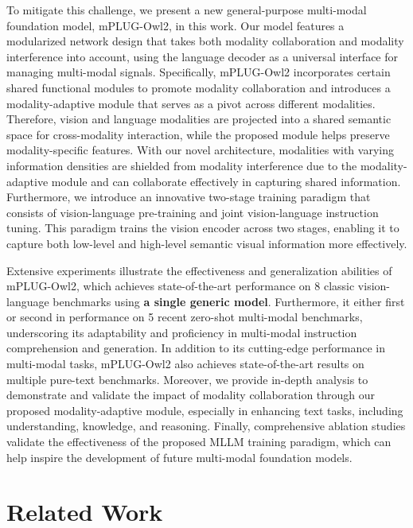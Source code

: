 \documentclass[10pt,twocolumn,letterpaper]{article}
\newcommand{\modelname}{mPLUG-Owl2\xspace}
\begin{document}
To mitigate this challenge, we present a new general-purpose multi-modal foundation model, \modelname, in this work. Our model features a modularized network design that takes both modality collaboration and modality interference into account, using the language decoder as a universal interface for managing multi-modal signals. Specifically, \modelname incorporates certain shared functional modules to promote modality collaboration and introduces a modality-adaptive module that serves as a pivot across different modalities. Therefore, vision and language modalities are projected into a shared semantic space for cross-modality interaction, while the proposed module helps preserve modality-specific features. With our novel architecture, modalities with varying information densities are shielded from modality interference due to the modality-adaptive module and can collaborate effectively in capturing shared information. Furthermore, we introduce an innovative two-stage training paradigm that consists of vision-language pre-training and joint vision-language instruction tuning. This paradigm trains the vision encoder across two stages, enabling it to capture both low-level and high-level semantic visual information more effectively.

Extensive experiments illustrate the effectiveness and generalization abilities of \modelname, which achieves state-of-the-art performance on 8 classic vision-language benchmarks using \textbf{a single generic model}. Furthermore, it either first or second in performance on 5 recent zero-shot multi-modal benchmarks, underscoring its adaptability and proficiency in multi-modal instruction comprehension and generation. In addition to its cutting-edge performance in multi-modal tasks, \modelname also achieves state-of-the-art results on multiple pure-text benchmarks. Moreover, we provide in-depth analysis to demonstrate and validate the impact of modality collaboration through our proposed modality-adaptive module, especially in enhancing text tasks, including understanding, knowledge, and reasoning. Finally, comprehensive ablation studies validate the effectiveness of the proposed MLLM training paradigm, which can help inspire the development of future multi-modal foundation models.

\vspace{-2ex}
\section{Related Work}
\vspace{-1ex}
\end{document}
